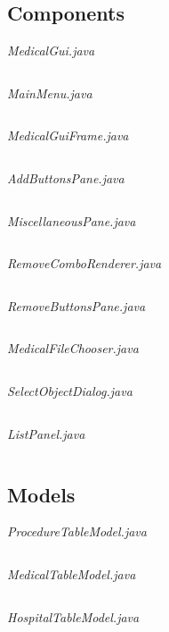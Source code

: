 \documentclass{article}
\begin{document}
\subsection{Components}\label{subsec:components} %
\textit{MedicalGui.java}
\inputminted{java}{./src/main/java/com/yvesstraten/medicalconsolegui/MedicalGui.java}

\textit{MainMenu.java}
\inputminted{java}{./src/main/java/com/yvesstraten/medicalconsolegui/components/MainMenu.java}

\textit{MedicalGuiFrame.java}
\inputminted{java}{./src/main/java/com/yvesstraten/medicalconsolegui/components/MedicalGuiFrame.java}

\textit{AddButtonsPane.java}
\inputminted{java}{./src/main/java/com/yvesstraten/medicalconsolegui/components/AddButtonsPane.java}

\textit{MiscellaneousPane.java}
\inputminted{java}{./src/main/java/com/yvesstraten/medicalconsolegui/components/MiscellaneousPane.java}

\textit{RemoveComboRenderer.java}
\inputminted{java}{./src/main/java/com/yvesstraten/medicalconsolegui/RemoveComboRenderer.java}

\textit{RemoveButtonsPane.java}
\inputminted{java}{./src/main/java/com/yvesstraten/medicalconsolegui/components/RemoveButtonsPane.java}

\textit{MedicalFileChooser.java}
\inputminted{java}{./src/main/java/com/yvesstraten/medicalconsolegui/components/MedicalFileChooser.java}

\textit{SelectObjectDialog.java}
\inputminted{java}{./src/main/java/com/yvesstraten/medicalconsolegui/components/SelectObjectDialog.java}

\textit{ListPanel.java}
\inputminted{java}{./src/main/java/com/yvesstraten/medicalconsolegui/components/ListPanel.java}

\subsection{Models}\label{sec:models} %
\textit{ProcedureTableModel.java}
\inputminted{java}{./src/main/java/com/yvesstraten/medicalconsolegui/models/ProcedureTableModel.java}

\textit{MedicalTableModel.java}
\inputminted{java}{./src/main/java/com/yvesstraten/medicalconsolegui/models/MedicalTableModel.java}

\textit{HospitalTableModel.java}
\inputminted{java}{./src/main/java/com/yvesstraten/medicalconsolegui/models/HospitalTableModel.java}
\end{document}
